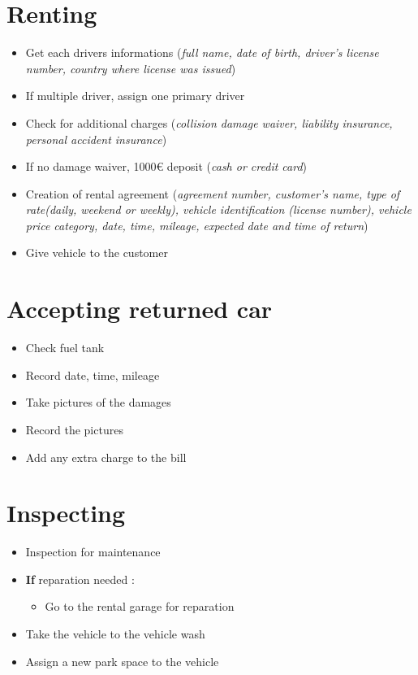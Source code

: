 \documentclass{report}
\begin{document}
\section{Renting}
    \begin{itemize}
        \item Get each drivers informations (\textit{full name, date of birth, driver's license number, country where license was issued})
        \item If multiple driver, assign one primary driver
        \item Check for additional charges (\textit{collision damage waiver, liability insurance, personal accident insurance})
        \item If no damage waiver, 1000\euro{} deposit (\textit{cash or credit card})
        \item Creation of rental agreement (\textit{agreement number, customer's name, type of rate(daily, weekend or weekly), vehicle identification (license number), vehicle price category, date, time, mileage, expected date and time of return})
        \item Give vehicle to the customer
    \end{itemize}

\section{Accepting returned car}
    \begin{itemize}
        \item Check fuel tank
        \item Record date, time, mileage
        \item Take pictures of the damages
        \item Record the pictures
        \item Add any extra charge to the bill
    \end{itemize}

\section{Inspecting}
    \begin{itemize}
        \item Inspection for maintenance
        \item \textbf{If} reparation needed :
        \begin{itemize}
            \item Go to the rental garage for reparation
        \end{itemize}
        \item Take the vehicle to the vehicle wash
        \item Assign a new park space to the vehicle
    \end{itemize}
\end{document}
